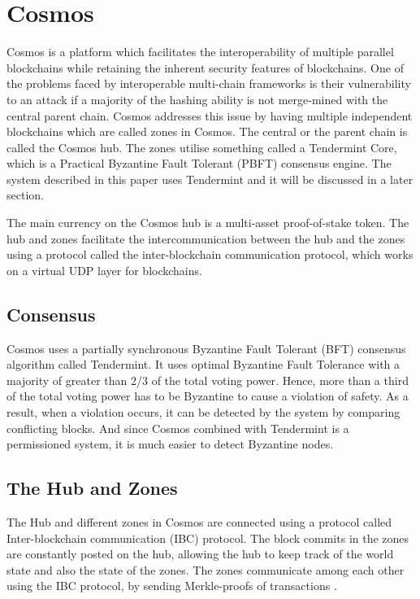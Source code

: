 \documentclass[a4paper,twoside,phd]{BYUPhys}
\begin{document}
\section{Cosmos}
Cosmos is a platform which facilitates the interoperability of multiple parallel blockchains while retaining the inherent security features of blockchains\cite{Kwon2018ALedgers}. One of the problems faced by interoperable multi-chain frameworks is their vulnerability to an attack if a majority of the hashing ability is not merge-mined with the central parent chain\cite{Kwon2018ALedgers}. Cosmos addresses this issue by having multiple independent blockchains which are called zones in Cosmos\cite{Kwon2018ALedgers}. The central or the parent chain is called the Cosmos hub\cite{Kwon2018ALedgers}. The zones utilise something called a Tendermint Core, which is a Practical Byzantine Fault Tolerant (PBFT) consensus engine\cite{TendermintTeam2018WhatDocumentation}. The system described in this paper uses Tendermint and it will be discussed in a later section.

The main currency on the Cosmos hub is a multi-asset proof-of-stake token\cite{Kwon2018ALedgers}. The hub and zones facilitate the intercommunication between the hub and the zones using a protocol called the inter-blockchain communication protocol, which works on a virtual UDP layer for blockchains.\cite{Kwon2018ALedgers}

\subsection{Consensus}
Cosmos uses a partially synchronous Byzantine Fault Tolerant (BFT) consensus algorithm called Tendermint\cite{Kwon2018ALedgers}. It uses optimal Byzantine Fault Tolerance with a majority of greater than 2/3 of the total voting power\cite{Kwon2018ALedgers}. Hence, more than a third of the total voting power has to be Byzantine to cause a violation of safety\cite{Kwon2018ALedgers}. As a result, when a violation occurs, it can be detected by the system by comparing conflicting blocks. And since Cosmos combined with Tendermint is a permissioned system, it is much easier to detect Byzantine nodes\cite{Kwon2018ALedgers}.

\subsection{The Hub and Zones}
The Hub and different zones in Cosmos are connected using a protocol called Inter-blockchain communication (IBC) protocol\cite{Kwon2018ALedgers}. The block commits in the zones are constantly posted on the hub, allowing the hub to keep track of the world state and also the state of the zones\cite{Kwon2018ALedgers}. The zones communicate among each other using the IBC protocol, by sending Merkle-proofs of transactions \cite{Kwon2018ALedgers}.
\end{document}
